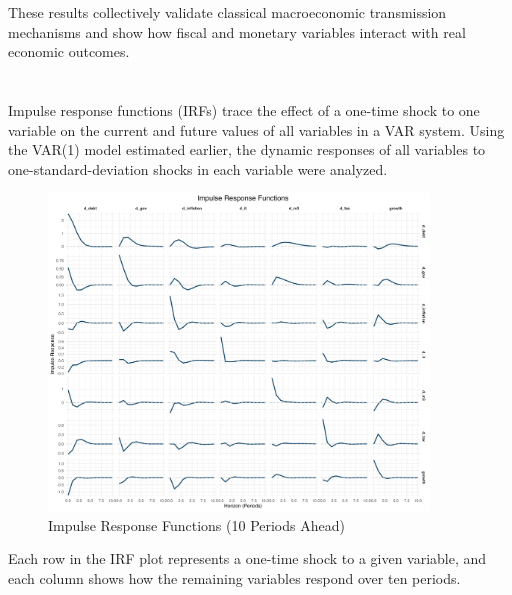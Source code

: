 \documentclass[a4paper,12pt]{article}
\begin{document}
These results collectively validate classical macroeconomic transmission mechanisms and show how fiscal and monetary variables interact with real economic outcomes.

\section{}

Impulse response functions (IRFs) trace the effect of a one-time shock to one variable on the current and future values of all variables in a VAR system. Using the VAR(1) model estimated earlier, the dynamic responses of all variables to one-standard-deviation shocks in each variable were analyzed.

\begin{figure}[H]
  \centering
  \includegraphics[width=0.9\textwidth]{../results/irf_faceted_plot.png}
  \caption{Impulse Response Functions (10 Periods Ahead)}
\end{figure}

Each row in the IRF plot represents a one-time shock to a given variable, and each column shows how the remaining variables respond over ten periods.
\end{document}
